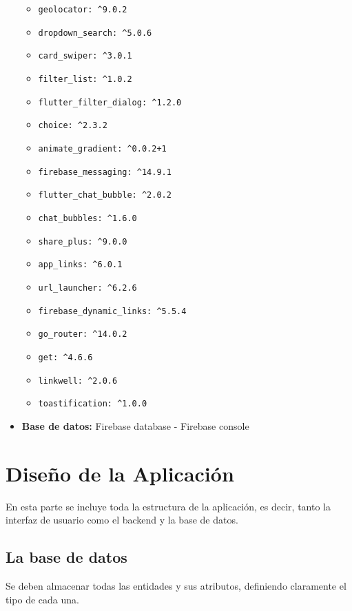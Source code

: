 \documentclass[a4paper, 12pt]{article}
\begin{document}
\begin{itemize}[noitemsep]
\begin{itemize}[noitemsep]
		  \item \texttt{geolocator: \^{}9.0.2}
		  \item \texttt{dropdown\_search: \^{}5.0.6}
		  \item \texttt{card\_swiper: \^{}3.0.1}
		  \item \texttt{filter\_list: \^{}1.0.2}
		  \item \texttt{flutter\_filter\_dialog: \^{}1.2.0}
		  \item \texttt{choice: \^{}2.3.2}
		  \item \texttt{animate\_gradient: \^{}0.0.2+1}
		  \item \texttt{firebase\_messaging: \^{}14.9.1}
		  \item \texttt{flutter\_chat\_bubble: \^{}2.0.2}
		  \item \texttt{chat\_bubbles: \^{}1.6.0}
		  \item \texttt{share\_plus: \^{}9.0.0}
		  \item \texttt{app\_links: \^{}6.0.1}
		  \item \texttt{url\_launcher: \^{}6.2.6}
		  \item \texttt{firebase\_dynamic\_links: \^{}5.5.4}
		  \item \texttt{go\_router: \^{}14.0.2}
		  \item \texttt{get: \^{}4.6.6}
		  \item \texttt{linkwell: \^{}2.0.6}
		  \item \texttt{toastification: \^{}1.0.0}
		\end{itemize}
	\item \textbf{Base de datos:} Firebase database - Firebase console \cite{firebase_console}
\end{itemize}

\newpage
\section{Diseño de la Aplicación}

En esta parte se incluye toda la estructura de la aplicación, es decir, tanto la interfaz de usuario como el backend y la base de datos.

\subsection{La base de datos}

Se deben almacenar todas las entidades y sus atributos, definiendo claramente el tipo de cada una.
\end{document}
